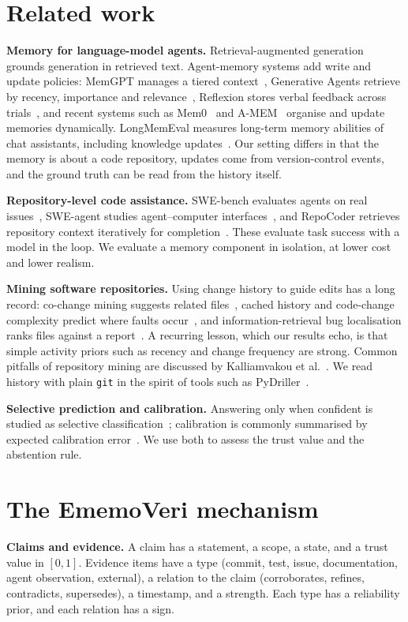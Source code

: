 \documentclass[11pt,a4paper]{article}
\newcommand{\sys}{EmemoVeri}
\begin{document}
\section{Related work}
\textbf{Memory for language-model agents.} Retrieval-augmented generation~\cite{lewis2020rag} grounds generation in retrieved text. Agent-memory systems add write and update policies: MemGPT manages a tiered context~\cite{packer2023memgpt}, Generative Agents retrieve by recency, importance and relevance~\cite{park2023generative}, Reflexion stores verbal feedback across trials~\cite{shinn2023reflexion}, and recent systems such as Mem0~\cite{chhikara2025mem0} and A-MEM~\cite{xu2025amem} organise and update memories dynamically. LongMemEval measures long-term memory abilities of chat assistants, including knowledge updates~\cite{wu2024longmemeval}. Our setting differs in that the memory is about a code repository, updates come from version-control events, and the ground truth can be read from the history itself.

\textbf{Repository-level code assistance.} SWE-bench evaluates agents on real issues~\cite{jimenez2024swebench}, SWE-agent studies agent--computer interfaces~\cite{yang2024sweagent}, and RepoCoder retrieves repository context iteratively for completion~\cite{zhang2023repocoder}. These evaluate task success with a model in the loop. We evaluate a memory component in isolation, at lower cost and lower realism.

\textbf{Mining software repositories.} Using change history to guide edits has a long record: co-change mining suggests related files~\cite{zimmermann2005mining}, cached history and code-change complexity predict where faults occur~\cite{kim2007cache,hassan2009complexity}, and information-retrieval bug localisation ranks files against a report~\cite{zhou2012buglocator}. A recurring lesson, which our results echo, is that simple activity priors such as recency and change frequency are strong. Common pitfalls of repository mining are discussed by Kalliamvakou et al.~\cite{kalliamvakou2014perils}. We read history with plain \texttt{git} in the spirit of tools such as PyDriller~\cite{spadini2018pydriller}.

\textbf{Selective prediction and calibration.} Answering only when confident is studied as selective classification~\cite{geifman2017selective}; calibration is commonly summarised by expected calibration error~\cite{guo2017calibration}. We use both to assess the trust value and the abstention rule.

\section{The \sys{} mechanism}
\label{sec:mech}
\textbf{Claims and evidence.} A claim has a statement, a scope, a state, and a trust value in $[0,1]$. Evidence items have a type (commit, test, issue, documentation, agent observation, external), a relation to the claim (corroborates, refines, contradicts, supersedes), a timestamp, and a strength. Each type has a reliability prior, and each relation has a sign.
\end{document}
